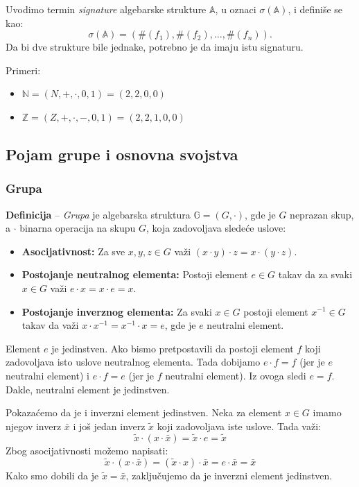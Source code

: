 \documentclass[a4paper,12pt]{article}
\begin{document}
Uvodimo termin \emph{signature} algebarske strukture $\mathbb{A}$, u oznaci \( \sigma (\mathbb{A}) \), i definiše se kao:
\[\sigma (\mathbb{A}) = (\#(f_1), \#(f_2), \dots, \#(f_n)).\]
Da bi dve strukture bile jednake, potrebno je da imaju istu signaturu.

Primeri:
\begin{itemize}
  \item \(\mathbb{N} = (N, +, \cdot, 0, 1) = (2, 2, 0, 0)\) 
  \item \(\mathbb{Z} = (Z, +, \cdot, -, 0, 1) = (2, 2, 1, 0, 0)\)
\end{itemize}
\subsection{Pojam grupe i osnovna svojstva}

\subsubsection{Grupa}

\textbf{Definicija} -- \emph{Grupa} je algebarska struktura \(\mathbb{G} = (G, \cdot)\), gde je \(G\) neprazan skup, a \(\cdot\) binarna operacija na skupu \(G\), koja zadovoljava sledeće uslove:
\begin{itemize}
  \item \textbf{Asocijativnost:} Za sve \(x, y, z \in G\) važi \((x \cdot y) \cdot z = x \cdot (y \cdot z)\).
  \item \textbf{Postojanje neutralnog elementa:} Postoji element \(e \in G\) takav da za svaki \(x \in G\) važi \(e \cdot x = x \cdot e = x\).
  \item \textbf{Postojanje inverznog elementa:} Za svaki \(x \in G\) postoji element \(x^{-1} \in G\) takav da važi \(x \cdot x^{-1} = x^{-1} \cdot x = e\), gde je \(e\) neutralni element.
\end{itemize}

Element \(e\) je jedinstven. Ako bismo pretpostavili da postoji element \( f \) koji 
zadovoljava isto uslove neutralnog elementa. Tada dobijamo \( e \cdot f = f \) 
(jer je \( e \) neutralni element) i \( e \cdot f = e \) (jer je \( f \) neutralni element). 
Iz ovoga sledi \( e = f \). Dakle, neutralni element je jedinstven.

Pokazaćemo da je i inverzni element jedinstven. Neka za element \( x \in G \) imamo njegov inverz \( \bar{x} \) i još jedan inverz \( \tilde{x} \) koji zadovoljava iste uslove.
Tada važi:
\[
  \tilde{x} \cdot (x \cdot \bar{x}) = \tilde{x} \cdot e = \tilde{x}
\]
Zbog asocijativnosti možemo napisati:
\[
  \tilde{x} \cdot (x \cdot \bar{x}) = (\tilde{x} \cdot x) \cdot \bar{x} = e \cdot \bar{x} = \bar{x}
\]
Kako smo dobili da je \( \tilde{x} = \bar{x} \), zaključujemo da je inverzni element jedinstven.
\end{document}
